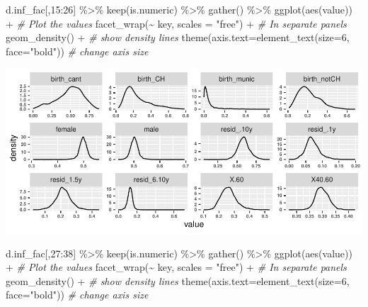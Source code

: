 \documentclass[
]{article}
\newenvironment{Shaded}{\begin{snugshade}}{\end{snugshade}}
\newcommand{\AttributeTok}[1]{\textcolor[rgb]{0.77,0.63,0.00}{#1}}
\newcommand{\CommentTok}[1]{\textcolor[rgb]{0.56,0.35,0.01}{\textit{#1}}}
\newcommand{\DecValTok}[1]{\textcolor[rgb]{0.00,0.00,0.81}{#1}}
\newcommand{\FunctionTok}[1]{\textcolor[rgb]{0.00,0.00,0.00}{#1}}
\newcommand{\NormalTok}[1]{#1}
\newcommand{\SpecialCharTok}[1]{\textcolor[rgb]{0.00,0.00,0.00}{#1}}
\newcommand{\StringTok}[1]{\textcolor[rgb]{0.31,0.60,0.02}{#1}}
\begin{document}
\begin{Shaded}
\begin{Highlighting}[]
\NormalTok{d.inf\_fac[,}\DecValTok{15}\SpecialCharTok{:}\DecValTok{26}\NormalTok{] }\SpecialCharTok{\%\textgreater{}\%}
  \FunctionTok{keep}\NormalTok{(is.numeric) }\SpecialCharTok{\%\textgreater{}\%}
  \FunctionTok{gather}\NormalTok{() }\SpecialCharTok{\%\textgreater{}\%}
  \FunctionTok{ggplot}\NormalTok{(}\FunctionTok{aes}\NormalTok{(value))  }\SpecialCharTok{+}                   \CommentTok{\# Plot the values}
    \FunctionTok{facet\_wrap}\NormalTok{(}\SpecialCharTok{\textasciitilde{}}\NormalTok{ key, }\AttributeTok{scales =} \StringTok{"free"}\NormalTok{) }\SpecialCharTok{+}  \CommentTok{\# In separate panels}
    \FunctionTok{geom\_density}\NormalTok{() }\SpecialCharTok{+}                      \CommentTok{\# show density lines}
    \FunctionTok{theme}\NormalTok{(}\AttributeTok{axis.text=}\FunctionTok{element\_text}\NormalTok{(}\AttributeTok{size=}\DecValTok{6}\NormalTok{, }\AttributeTok{face=}\StringTok{"bold"}\NormalTok{)) }\CommentTok{\# change axis size}
\end{Highlighting}
\end{Shaded}

\includegraphics{Lin_Mod_Clus_Analysis_files/figure-latex/unnamed-chunk-4-2.pdf}

\begin{Shaded}
\begin{Highlighting}[]
\NormalTok{d.inf\_fac[,}\DecValTok{27}\SpecialCharTok{:}\DecValTok{38}\NormalTok{] }\SpecialCharTok{\%\textgreater{}\%}
  \FunctionTok{keep}\NormalTok{(is.numeric) }\SpecialCharTok{\%\textgreater{}\%}
  \FunctionTok{gather}\NormalTok{() }\SpecialCharTok{\%\textgreater{}\%}
  \FunctionTok{ggplot}\NormalTok{(}\FunctionTok{aes}\NormalTok{(value))  }\SpecialCharTok{+}                   \CommentTok{\# Plot the values}
    \FunctionTok{facet\_wrap}\NormalTok{(}\SpecialCharTok{\textasciitilde{}}\NormalTok{ key, }\AttributeTok{scales =} \StringTok{"free"}\NormalTok{) }\SpecialCharTok{+}  \CommentTok{\# In separate panels}
    \FunctionTok{geom\_density}\NormalTok{() }\SpecialCharTok{+}                      \CommentTok{\# show density lines}
    \FunctionTok{theme}\NormalTok{(}\AttributeTok{axis.text=}\FunctionTok{element\_text}\NormalTok{(}\AttributeTok{size=}\DecValTok{6}\NormalTok{, }\AttributeTok{face=}\StringTok{"bold"}\NormalTok{)) }\CommentTok{\# change axis size}
\end{Highlighting}
\end{Shaded}
\end{document}
